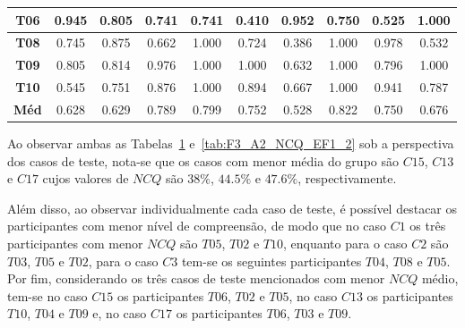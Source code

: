 \begin{table}[htbp]
\begin{tabular}{|c|ccccccccc|}
		\textbf{T06} & \multicolumn{1}{c|}{0.945} & \multicolumn{1}{c|}{0.805} & \multicolumn{1}{c|}{0.741} & \multicolumn{1}{c|}{0.741} & \multicolumn{1}{c|}{0.410} & \multicolumn{1}{c|}{0.952} & \multicolumn{1}{c|}{0.750} & \multicolumn{1}{c|}{0.525} & 1.000 \\ \hline
		\rowcolor[HTML]{F2F2F2} 
		\textbf{T08} & \multicolumn{1}{c|}{\cellcolor[HTML]{F2F2F2}0.745} & \multicolumn{1}{c|}{\cellcolor[HTML]{F2F2F2}0.875} & \multicolumn{1}{c|}{\cellcolor[HTML]{F2F2F2}0.662} & \multicolumn{1}{c|}{\cellcolor[HTML]{F2F2F2}1.000} & \multicolumn{1}{c|}{\cellcolor[HTML]{F2F2F2}0.724} & \multicolumn{1}{c|}{\cellcolor[HTML]{F2F2F2}0.386} & \multicolumn{1}{c|}{\cellcolor[HTML]{F2F2F2}1.000} & \multicolumn{1}{c|}{\cellcolor[HTML]{F2F2F2}0.978} & 0.532 \\ \hline
		\textbf{T09} & \multicolumn{1}{c|}{0.805} & \multicolumn{1}{c|}{0.814} & \multicolumn{1}{c|}{0.976} & \multicolumn{1}{c|}{1.000} & \multicolumn{1}{c|}{1.000} & \multicolumn{1}{c|}{0.632} & \multicolumn{1}{c|}{1.000} & \multicolumn{1}{c|}{0.796} & 1.000 \\ \hline
		\rowcolor[HTML]{F2F2F2} 
		\textbf{T10} & \multicolumn{1}{c|}{\cellcolor[HTML]{F2F2F2}0.545} & \multicolumn{1}{c|}{\cellcolor[HTML]{F2F2F2}0.751} & \multicolumn{1}{c|}{\cellcolor[HTML]{F2F2F2}0.876} & \multicolumn{1}{c|}{\cellcolor[HTML]{F2F2F2}1.000} & \multicolumn{1}{c|}{\cellcolor[HTML]{F2F2F2}0.894} & \multicolumn{1}{c|}{\cellcolor[HTML]{F2F2F2}0.667} & \multicolumn{1}{c|}{\cellcolor[HTML]{F2F2F2}1.000} & \multicolumn{1}{c|}{\cellcolor[HTML]{F2F2F2}0.941} & 0.787 \\ \hline
		\textbf{Méd} & \multicolumn{1}{c|}{0.628} & \multicolumn{1}{c|}{0.629} & \multicolumn{1}{c|}{0.789} & \multicolumn{1}{c|}{0.799} & \multicolumn{1}{c|}{0.752} & \multicolumn{1}{c|}{0.528} & \multicolumn{1}{c|}{0.822} & \multicolumn{1}{c|}{0.750} & 0.676 \\ \hline
	\end{tabular}
	\label{tab:F3_A2_NCQ_EF1}
\end{table}

Ao observar ambas as Tabelas~\ref{tab:F3_A2_NCQ_EF1} e~\ref{tab:F3_A2_NCQ_EF1_2} sob a perspectiva dos casos de teste, nota-se que os casos com menor média do grupo são $C15$, $C13$ e $C17$ cujos valores de $NCQ$ são $38\%$, $44.5\%$ e $47.6\%$, respectivamente.

Além disso, ao observar individualmente cada caso de teste, é possível destacar os participantes com menor nível de compreensão, de modo que no caso $C1$ os três participantes com menor $NCQ$ são $T05$, $T02$ e $T10$, enquanto para o caso $C2$ são $T03$, $T05$ e $T02$, para o caso $C3$ tem-se os seguintes participantes $T04$, $T08$ e $T05$. Por fim, considerando os três casos de teste mencionados com menor $NCQ$ médio, tem-se no caso $C15$ os participantes $T06$, $T02$ e $T05$, no caso $C13$ os participantes $T10$, $T04$ e $T09$ e, no caso $C17$ os participantes $T06$, $T03$ e $T09$. 

